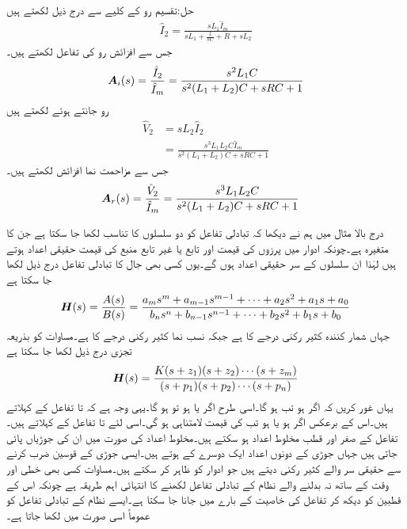 حل:تقسیم رو کے کلیے سے درج ذیل لکھتے ہیں
\begin{align*}
\hat{I}_2=\frac{ sL_1 \hat{I}_m}{sL_1+\frac{1}{sC}+R+sL_2}
\end{align*}
جس سے افزائش رو کی تفاعل لکھتے ہیں۔
\begin{align*}
{\ensuremath{{\boldsymbol{A}}}}_i(s)=\frac{\hat{I}_2}{\hat{I}_m}=\frac{ s^2 L_1 C}{s^2 (L_1+L_2)C +s RC +1}
\end{align*}
رو  جانتے ہوئے  لکھتے ہیں
\begin{align*}
\hat{V}_2&= sL_2\hat{I}_2\\
&=\frac{ s^3 L_1 L_2 C \hat{I}_m}{s^2 (L_1+L_2)C +s RC +1}
\end{align*}
جس سے مزاحمت نما افزائش لکھتے ہیں۔
\begin{align*}
{\ensuremath{{\boldsymbol{A}}}}_r(s)&=\frac{\hat{V}_2}{\hat{I}_m}=\frac{ s^3 L_1 L_2 C}{s^2 (L_1+L_2)C +s RC +1}
\end{align*}

درج بالا مثال میں ہم نے دیکھا کہ تبادلی تفاعل کو دو سلسلوں کا تناسب  لکھا جا سکتا ہے جن کا متغیرہ  ہے۔چونکہ ادوار میں پرزوں کی قیمت اور تابع یا غیر تابع منبع کی قیمت حقیقی اعداد ہوتے ہیں لہٰذا ان سلسلوں کے سر حقیقی  اعداد ہوں گے۔یوں کسی بھی جال کا تبادلی تفاعل درج ذیل لکھا جا سکتا ہے
\begin{align}\label{مساوات_تعددی_تبادلی_تفاعل_الف}
{\ensuremath{{\boldsymbol{H}}}}(s)=\frac{A(s)}{B(s)}=\frac{a_m s^m+a_{m-1} s^{m-1}+\cdots+a_2 s^2+a_1 s+a_0}{b_n s^n+b_{n-1} s^{n-1}+\cdots+b_2 s^2+b_1 s+b_0}
\end{align}
جہاں شمار کنندہ کثیر رکنی  درجے کا ہے جبکہ  نسب نما کثیر رکنی  درجے کا ہے۔مساوات  کو بذریعہ تجزی درج ذیل لکھا جا سکتا ہے
\begin{align}\label{مساوات_تعددی_تبادلی_تفاعل_ب}
{\ensuremath{{\boldsymbol{H}}}}(s)=\frac{K (s+z_1)(s+z_2)\cdots (s+z_m)}{(s+p_1)(s+p_2) \cdots (s+p_n)}
\end{align}
یہاں غور کریں کہ اگر  ہو تب  ہو گا۔اسی طرح  اگر  یا  ہو تو   ہو گا۔یہی وجہ ہے کہ  تا  تفاعل کے  کہلاتے ہیں۔اس کے برعکس اگر  ہو یا   ہو تب  کی قیمت لامتناہی ہو گی۔اسی لئے  تا  تفاعل کے  کہلاتے ہیں۔تفاعل کے صفر اور قطب مخلوط اعداد ہو سکتے ہیں۔مخلوط اعداد کی صورت میں ان کی جوڑیاں پائی جاتی ہیں جہاں جوڑی کے دونوں اعداد ایک دوسرے کے  ہوتے ہیں۔ایسی جوڑی کے قوسین ضرب کرنے سے حقیقی سر والے کثیر رکنی دیتے ہیں جو ادوار کو ظاہر کر سکتے ہیں۔مساوات  کسی بھی خطی اور وقت کے ساتھ نہ بدلنے والے نظام کے تبادلی تفاعل لکھنے کا انتہائی اہم طریقہ ہے چونکہ اس کے قطبین کو دیکھ کر تفاعل کی خاصیت کے بارے میں جانا جا سکتا ہے۔ایسے نظام کے تبادلی تفاعل کو عموماً اسی صورت میں لکھا جاتا ہے۔

